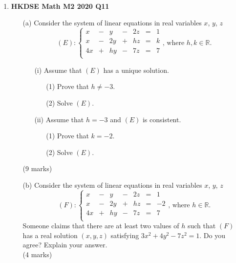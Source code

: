 \documentclass{report}
\begin{document}
\begin{enumerate}
	\item \textbf{HKDSE Math M2 2020 Q11}
	\begin{enumerate}
		\item [(a)] Consider the system of linear equations in real variables $x$, $y$, $z$
		$$(E):\left\{\begin{matrix}
		x&  -& y& -&2z& = & 1  \\
		x&  -&2y& +&hz& = & k \\
		4x& +&hy& -&7z& = & 7 \\
		\end{matrix}\right. \text{, where }h,k \in \mathbb{R}.$$
		\begin{enumerate}
			\item [(i)]Assume that $(E)$ has a unique solution.
			\begin{enumerate}
				\item [(1)]Prove that $h \neq -3$. 
				\item [(2)]Solve $(E)$.
			\end{enumerate}
			\item [(ii)]Assume that $h = -3$ and $(E)$ is consistent.
			\begin{enumerate}
				\item [(1)]Prove that $k = -2$. 
				\item [(2)]Solve $(E)$. 
			\end{enumerate}
		\end{enumerate}
		(9 marks)
		\item[(b)]Consider the system of linear equations in real variables $x$, $y$, $z$
			$$(F):\left\{\begin{matrix}
			x&  -&y&  -&2z& = &1  \\
			x&  -&2y&  +&hz& = & -2 \\
			4x&  +&hy&  -&7z& = & 7 \\
			\end{matrix}\right. \text{, where }h \in \mathbb{R}.$$
			Someone claims that there are at least two values of $h$ such that $(F)$ has a real solution $(x,y,z)$ satisfying $3x^2+4y^2-7z^2=1$. Do you agree? Explain your answer. \\(4 marks)
	\end{enumerate}


\end{enumerate}
\end{document}

